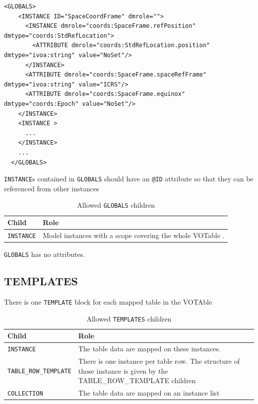 \documentclass[11pt,a4paper]{ivoa}
\begin{document}
\begin{lstlisting}[caption={INSTANCE bloc example},captionpos=b]
  <GLOBALS>
    <INSTANCE ID="SpaceCoordFrame" dmrole="">
      <INSTANCE dmrole="coords:SpaceFrame.refPosition" dmtype="coords:StdRefLocation">
        <ATTRIBUTE dmrole="coords:StdRefLocation.position" dmtype="ivoa:string" value="NoSet"/>
      </INSTANCE>
      <ATTRIBUTE dmrole="coords:SpaceFrame.spaceRefFrame" dmtype="ivoa:string" value="ICRS"/>
      <ATTRIBUTE dmrole="coords:SpaceFrame.equinox" dmtype="coords:Epoch" value="NoSet"/>
    </INSTANCE>
    <INSTANCE >
      ... 
    </INSTANCE>
    ...
  </GLOBALS>
\end{lstlisting}

\texttt{INSTANCE}s contained in \texttt{GLOBALS} should have an  \texttt{@ID} attribute so that they can be referenced from other instances


\begin{table}[ht!]
     \begin{tabular}{|p{3cm}|p{7cm}|}
       \hline Child &  Role\\
       \hline  \texttt{INSTANCE}    &  Model instances with a scope covering the whole VOTable . \\       
       \hline 
     \end{tabular}
     \caption{Allowed  \texttt{GLOBALS} children} 
 \end{table}

 \texttt{GLOBALS} has no attributes. 


\subsection{TEMPLATES}

There is one \texttt{TEMPLATE} block for each mapped table in the VOTAble 

\begin{table}[ht!]
     \begin{tabular}{|p{3cm}|p{7cm}|}
       \hline Child &  Role\\
       \hline  \texttt{INSTANCE}    & The table data are mapped on these instances.  \\              
       \hline  \texttt{TABLE\_ROW\_TEMPLATE}    &  There is one instance per table row. The structure of those instance is given by the TABLE\_ROW\_TEMPLATE children \\              
       \hline  \texttt{COLLECTION}    &  The table data are mapped on an instance list\\       
       \hline 
     \end{tabular}
     \caption{Allowed  \texttt{TEMPLATES} children} 
 \end{table}
\end{document}
